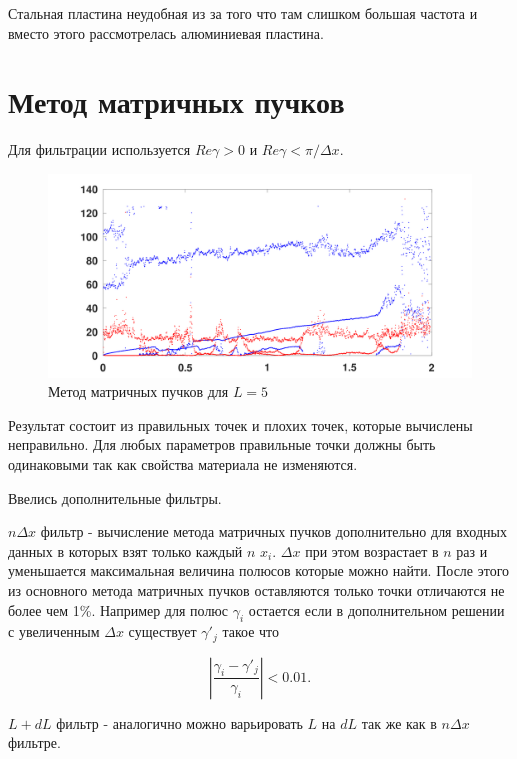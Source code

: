 \documentclass{article}
\begin{document}
	\large
	
	Стальная пластина неудобная из за того что там слишком большая частота и вместо этого рассмотрелась алюминиевая пластина.
	
	\section{Метод матричных пучков}
	
	Для фильтрации используется $Re\gamma>0$ и $Re\gamma<\pi/\Delta x$.
	
	\begin{figure}[!h]
		\begin{center}
			\includegraphics[width=0.9\linewidth]{images/matrix_pencil_method/unfiltered.png}
			\caption{Метод матричных пучков для $L=5$}
			\label{mpmmainL5}
		\end{center}
	\end{figure}
	
	Результат состоит из правильных точек и плохих точек, которые вычислены неправильно. Для любых параметров правильные точки должны быть одинаковыми так как свойства материала не изменяются.
	
	Ввелись дополнительные фильтры.
	
	$n\Delta x$ фильтр - вычисление метода матричных пучков дополнительно для входных данных в которых взят только каждый $n$ $x_i$. $\Delta x$ при этом возрастает в $n$ раз и уменьшается максимальная величина полюсов которые можно найти. После этого из основного метода матричных пучков оставляются только точки отличаются не более чем 1\%. Например для полюс $\gamma_i$ остается если в дополнительном решении с увеличенным $\Delta x$ существует $\gamma'_j$ такое что
	
	\begin{equation}
		|\frac{\gamma_i-\gamma'_j}{\gamma_i}|<0.01.
	\end{equation}
	
	$L+dL$ фильтр - аналогично можно варьировать $L$ на $dL$ так же как в $n\Delta x$ фильтре.
	
\end{document}
